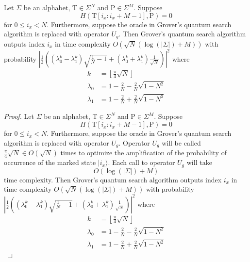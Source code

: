 \begin{lemma}
Let $\Sigma$ be an alphabet, $\text{T} \in \Sigma^{N}$ and $\text{P} \in \Sigma^{M}$. Suppose
\begin{equation*}
H\left(\text{T}[i_{x}:i_{x}+ M-1], \text{P}\right) = 0
\end{equation*}
for $0 \leq i_{x} < N$. Furthermore, suppose the oracle in Grover's quantum search algorithm is replaced with operator $U_{g}$. Then Grover's quantum search algorithm outputs index $i_{x}$ in time complexity $O\left(\sqrt{N}\left( \log(\vert\Sigma\vert) + M\right)\right)$ with probability $\left\vert \frac{1}{2}\left( \left( \lambda_{0}^{k} - \lambda_{1}^{k} \right) \sqrt{\frac{1}{N}-1} + \left( \lambda_{0}^{k} + \lambda_{1}^{k} \right) \frac{1}{\sqrt{N}} \right) \right\vert^2$ where 
\begin{align*}
k &= \left\lfloor\frac{\pi}{4}\sqrt{N}\right\rfloor\\
\lambda_0 &= 1 - \frac{2}{N} - \frac{2}{N}\sqrt{1-N^2}\\
\lambda_1 &= 1 - \frac{2}{N} + \frac{2}{N}\sqrt{1-N^2}
\end{align*}
\end{lemma}
\begin{proof}
Let $\Sigma$ be an alphabet, $\text{T} \in \Sigma^{N}$ and $\text{P} \in \Sigma^{M}$. Suppose
\begin{equation*}
H\left(\text{T}[i_{x}:i_{x}+ M-1], \text{P}\right) = 0
\end{equation*}
for $0 \leq i_{x} < N$. Furthermore, suppose the oracle in Grover's quantum search algorithm is replaced with operator $U_{g}$. Operator $U_{g}$ will be called $\frac{\pi}{4}\sqrt{N} \in O\left(\sqrt{N}\right)$ times to optimize the amplification of the probability of occurrence of the marked state $\vert i_{x}\rangle$. Each call to operator $U_{g}$ will take
\begin{equation*}
O\left(\log(\vert\Sigma\vert) + M\right)
\end{equation*}
time complexity. Then Grover's quantum search algorithm outputs index $i_{x}$ in time complexity $O\left(\sqrt{N}\left( \log(\vert\Sigma\vert) + M\right)\right)$ with probability $\left\vert \frac{1}{2}\left( \left( \lambda_{0}^{k} - \lambda_{1}^{k} \right) \sqrt{\frac{1}{N}-1} + \left( \lambda_{0}^{k} + \lambda_{1}^{k} \right) \frac{1}{\sqrt{N}} \right) \right\vert^2$ where 
\begin{align*}
k &= \left\lfloor\frac{\pi}{4}\sqrt{N}\right\rfloor \\
\lambda_0 &= 1 - \frac{2}{N} - \frac{2}{N}\sqrt{1-N^2}\\
\lambda_1 &= 1 - \frac{2}{N} + \frac{2}{N}\sqrt{1-N^2}
\end{align*}
\end{proof}
